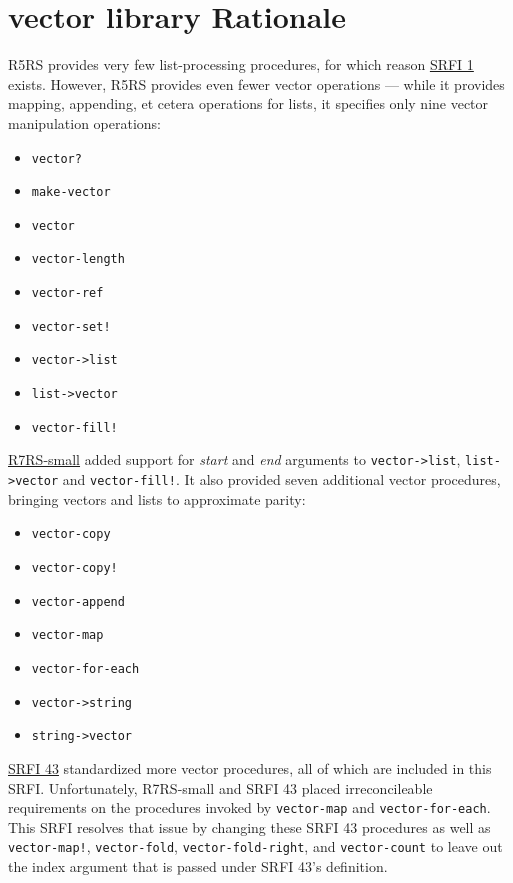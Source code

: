 \section{{vector library Rationale}}

R5RS provides very few list-processing
procedures, for which reason \protect\hyperlink{SRFI-1}{SRFI 1} exists.
However, R5RS provides even fewer vector
operations --- while it provides mapping, appending, et cetera
operations for lists, it specifies only nine vector manipulation
operations:

\begin{itemize}
\tightlist
\item
  \texttt{vector?}
\item
  \texttt{make-vector}
\item
  \texttt{vector}
\item
  \texttt{vector-length}
\item
  \texttt{vector-ref}
\item
  \texttt{vector-set!}
\item
  \texttt{vector-\textgreater{}list}
\item
  \texttt{list-\textgreater{}vector}
\item
  \texttt{vector-fill!}
\end{itemize}

\protect\hyperlink{R7RS-small}{R7RS-small} added support for
\emph{start} and \emph{end} arguments to
\texttt{vector-\textgreater{}list}, \texttt{list-\textgreater{}vector}
and \texttt{vector-fill!}. It also provided seven additional vector
procedures, bringing vectors and lists to approximate parity:

\begin{itemize}
\tightlist
\item
  \texttt{vector-copy}
\item
  \texttt{vector-copy!}
\item
  \texttt{vector-append}
\item
  \texttt{vector-map}
\item
  \texttt{vector-for-each}
\item
  \texttt{vector-\textgreater{}string}
\item
  \texttt{string-\textgreater{}vector}
\end{itemize}

\protect\hyperlink{SRFI-43}{SRFI 43} standardized more vector
procedures, all of which are included in this SRFI. Unfortunately,
R7RS-small and SRFI 43 placed irreconcileable requirements on the
procedures invoked by \texttt{vector-map} and \texttt{vector-for-each}.
This SRFI resolves that issue by changing these SRFI 43 procedures as
well as \texttt{vector-map!}, \texttt{vector-fold},
\texttt{vector-fold-right}, and \texttt{vector-count} to leave out the
index argument that is passed under SRFI 43's definition.

